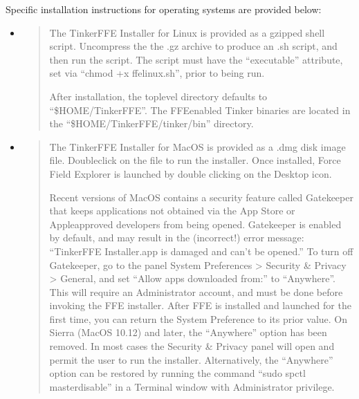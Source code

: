 \documentclass[letterpaper,11pt,english]{sphinxmanual}
\begin{document}
\sphinxAtStartPar
Specific installation instructions for operating systems are provided below:
\begin{itemize}
\item {} 
\sphinxAtStartPar
{}
\begin{quote}

\sphinxAtStartPar
The Tinker\sphinxhyphen{}FFE Installer for Linux is provided as a gzipped shell script. Uncompress the the .gz archive to produce an .sh script, and then run the script. The script must have the “executable” attribute, set via “chmod +x ffe\sphinxhyphen{}linux.sh”, prior to being run.

\sphinxAtStartPar
After installation, the top\sphinxhyphen{}level directory defaults to “\$HOME/Tinker\sphinxhyphen{}FFE”. The FFE\sphinxhyphen{}enabled Tinker binaries are located in the “\$HOME/Tinker\sphinxhyphen{}FFE/tinker/bin” directory.
\end{quote}

\item {} 
\sphinxAtStartPar
{}
\begin{quote}

\sphinxAtStartPar
The Tinker\sphinxhyphen{}FFE Installer for MacOS is provided as a .dmg disk image file. Double\sphinxhyphen{}click on the file to run the installer. Once installed, Force Field Explorer is launched by double clicking on the Desktop icon.

\sphinxAtStartPar
Recent versions of MacOS contains a security feature called Gatekeeper that keeps applications not obtained via the App Store or Apple\sphinxhyphen{}approved developers from being opened. Gatekeeper is enabled by default, and may result in the (incorrect!) error message: “Tinker\sphinxhyphen{}FFE Installer.app is damaged and can’t be opened.” To turn off Gatekeeper, go to the panel System Preferences \textgreater{} Security \& Privacy \textgreater{} General, and set “Allow apps downloaded from:” to “Anywhere”. This will require an Administrator account, and must be done before invoking the FFE installer. After FFE is installed and launched for the first time, you can return the System Preference to its prior value. On Sierra (MacOS 10.12) and later, the “Anywhere” option has been removed. In most cases the Security \& Privacy panel will open and permit the user to run the installer. Alternatively, the “Anywhere” option can be restored by running the command “sudo spctl \textendash{}master\sphinxhyphen{}disable” in a Terminal window with Administrator privilege.
\end{quote}


\end{itemize}
\end{document}
